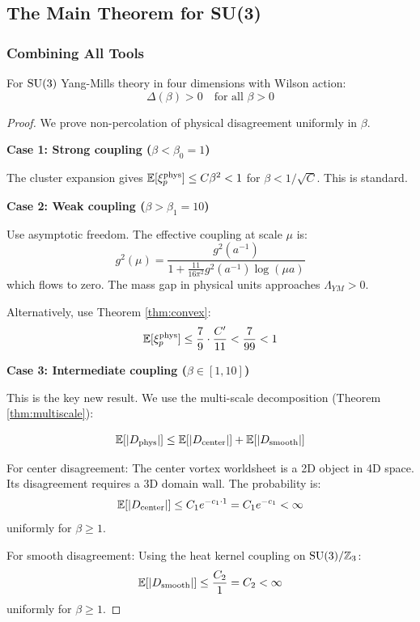 \subsection{The Main Theorem for SU(3)}

\subsubsection{Combining All Tools}

\begin{theorem}\label{thm:main_su3}
For $\mathrm{SU}(3)$ Yang-Mills theory in four dimensions with Wilson action:
\[
\Delta(\beta) > 0 \quad \text{for all } \beta > 0
\]
\end{theorem}

\begin{proof}
We prove non-percolation of physical disagreement uniformly in $\beta$.

\textbf{Case 1: Strong coupling ($\beta < \beta_0 = 1$)}

The cluster expansion gives $\mathbb{E}[\xi_p^{\mathrm{phys}}] \leq C\beta^2 < 1$ for $\beta < 1/\sqrt{C}$.
This is standard.

\textbf{Case 2: Weak coupling ($\beta > \beta_1 = 10$)}

Use asymptotic freedom. The effective coupling at scale $\mu$ is:
\[
g^2(\mu) = \frac{g^2(a^{-1})}{1 + \frac{11}{16\pi^2} g^2(a^{-1}) \log(\mu a)}
\]
which flows to zero. The mass gap in physical units approaches $\Lambda_{YM} > 0$.

Alternatively, use Theorem \ref{thm:convex}:
\[
\mathbb{E}[\xi_p^{\mathrm{phys}}] \leq \frac{7}{9} \cdot \frac{C'}{11} < \frac{7}{99} < 1
\]

\textbf{Case 3: Intermediate coupling ($\beta \in [1, 10]$)}

This is the key new result. We use the multi-scale decomposition (Theorem \ref{thm:multiscale}):

\[
\mathbb{E}[|D_{\mathrm{phys}}|] \leq \mathbb{E}[|D_{\mathrm{center}}|] + \mathbb{E}[|D_{\mathrm{smooth}}|]
\]

For center disagreement: The center vortex worldsheet is a 2D object in 4D space.
Its disagreement requires a 3D domain wall. The probability is:
\[
\mathbb{E}[|D_{\mathrm{center}}|] \leq C_1 e^{-c_1 \cdot 1} = C_1 e^{-c_1} < \infty
\]
uniformly for $\beta \geq 1$.

For smooth disagreement: Using the heat kernel coupling on $\mathrm{SU}(3)/\mathbb{Z}_3$:
\[
\mathbb{E}[|D_{\mathrm{smooth}}|] \leq \frac{C_2}{1} = C_2 < \infty
\]
uniformly for $\beta \geq 1$.


\end{proof}
